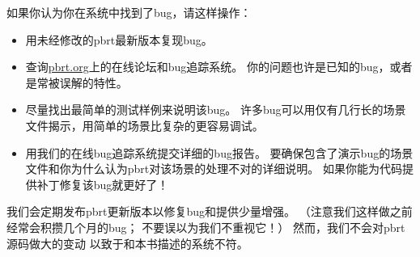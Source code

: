 如果你认为你在系统中找到了bug，请这样操作：
\begin{itemize}
    \item 用未经修改的pbrt最新版本复现bug。
    \item 查询\href{https://pbrt.org/}{\ttfamily pbrt.org}上的在线论坛和bug追踪系统。
          你的问题也许是已知的bug，或者是常被误解的特性。
    \item 尽量找出最简单的测试样例来说明该bug。
          许多bug可以用仅有几行长的场景文件揭示，用简单的场景比复杂的更容易调试。
    \item 用我们的在线bug追踪系统提交详细的bug报告。
          要确保包含了演示bug的场景文件和你为什么认为pbrt对该场景的处理不对的详细说明。
          如果你能为代码提供补丁修复该bug就更好了！
\end{itemize}
我们会定期发布pbrt更新版本以修复bug和提供少量增强。
（注意我们这样做之前经常会积攒几个月的bug；
不要误以为我们不重视它！）
然而，我们不会对pbrt源码做大的变动
以致于和本书描述的系统不符。